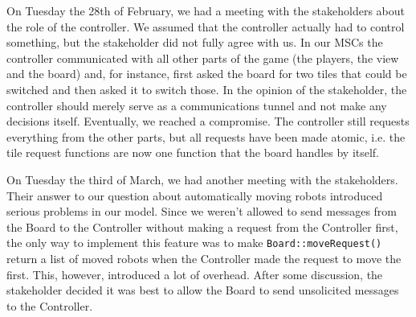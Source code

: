 On Tuesday the 28th of February, we had a meeting with the stakeholders about the role of the controller. We assumed that the controller actually had to control something, but the stakeholder did not fully agree with us. In our MSCs the controller communicated with all other parts of the game (the players, the view and the board) and, for instance, first asked the board for two tiles that could be switched and then asked it to switch those. In the opinion of the stakeholder, the controller should merely serve as a communications tunnel and not make any decisions itself. Eventually, we reached a compromise. The controller still requests everything from the other parts, but all requests have been made atomic, i.e. the tile request functions are now one function that the board handles by itself.

On Tuesday the third of March, we had another meeting with the stakeholders. Their answer to our question about automatically moving robots introduced serious problems in our model. Since we weren't allowed to send messages from the Board to the Controller without making a request from the Controller first, the only way to implement this feature was to make \texttt{Board::moveRequest()} return a list of moved robots when the Controller made the request to move the first. This, however, introduced a lot of overhead. After some discussion, the stakeholder decided it was best to allow the Board to send unsolicited messages to the Controller.
